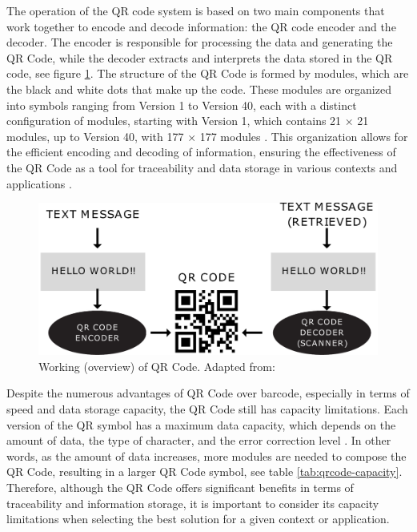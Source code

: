 The operation of the QR code system is based on two main components that work together to encode and decode information: the QR code encoder and the decoder. The encoder is responsible for processing the data and generating the QR Code, while the decoder extracts and interprets the data stored in the QR code, see figure \ref{fig:qr}. The structure of the QR Code is formed by modules, which are the black and white dots that make up the code. These modules are organized into symbols ranging from Version 1 to Version 40, each with a distinct configuration of modules, starting with Version 1, which contains 21 × 21 modules, up to Version 40, with 177 × 177 modules \cite{iso_18004_2015}. This organization allows for the efficient encoding and decoding of information, ensuring the effectiveness of the QR Code as a tool for traceability and data storage in various contexts and applications \cite{Tiwari2016}.


\begin{figure}[h!]
\centering
\includegraphics[width=.65\linewidth]{images/Development/chap3/QR.pdf}
\caption{Working (overview) of QR Code. Adapted from: \cite{Tiwari2016}}
\label{fig:qr}
\end{figure}

Despite the numerous advantages of QR Code over barcode, especially in terms of speed and data storage capacity, the QR Code still has capacity limitations. Each version of the QR symbol has a maximum data capacity, which depends on the amount of data, the type of character, and the error correction level \cite{Tiwari2016}. In other words, as the amount of data increases, more modules are needed to compose the QR Code, resulting in a larger QR Code symbol, see table \ref{tab:qrcode-capacity}. Therefore, although the QR Code offers significant benefits in terms of traceability and information storage, it is important to consider its capacity limitations when selecting the best solution for a given context or application.

